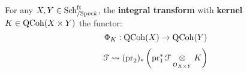    \begin{definition} \label{def: integral_transforms}
        For any $X, Y \in \mathrm{Sch}_{/\mathrm{Spec} k}^{\mathrm{ft}}$, the \textbf{integral transform} with \textbf{kernel} $K \in \QCoh(X \x Y)$ the functor:
            $$\Phi_K: \mathrm{QCoh}(X) \to \mathrm{QCoh}(Y)$$
            $$\calF \mapsto (\pr_2)_*\left( \pr_1^* \calF \tensor_{\calO_{X \x Y}} K \right)$$
    \end{definition}
    \begin{proposition} \label{prop: convolution_of_sheaves}
        
    \end{proposition}